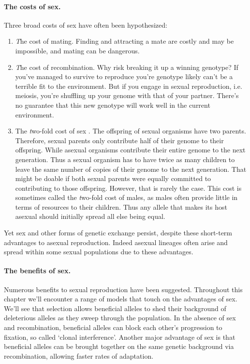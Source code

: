 \paragraph{The costs of sex.}
Three broad costs of sex have often been hypothesized:
\begin{enumerate}
\item  {\emph The cost of mating}. Finding and attracting a mate are costly and may be impossible, and mating can be dangerous.
\item  {\emph The cost of recombination.} Why risk breaking it up a winning genotype? If you've managed to survive to reproduce you're genotype likely can't be a terrible fit to the environment. But if you engage in sexual reproduction, i.e. meiosis, you're shuffling up your genome with that of your partner. There's no guarantee that this new genotype will work well in the current environment. 
\item The  {\emph two-fold cost of sex} \citep{smith1971origin}. The offspring of sexual organisms have two parents. Therefore, sexual parents only contribute half of their genome to their offspring. While asexual organisms contribute their entire genome to the next generation. Thus a sexual organism has to have twice as many children to leave the same number of copies of their genome to the next generation. That might be doable if both sexual parents were equally committed to contributing to those offspring. However, that is rarely the case. This cost is sometimes called the {\emph two-fold cost of males}, as males often provide little in terms of resources to their children. Thus any allele that makes its host asexual should initially spread all else being equal. 
\end{enumerate}
Yet sex and other forms of genetic exchange persist, despite these short-term advantages to asexual reproduction. Indeed asexual lineages often arise and spread within some sexual populations due to these advantages. 

\paragraph{The benefits of sex.}
Numerous benefits to sexual reproduction have been suggested. Throughout this chapter we'll encounter a range of models that touch on the advantages of sex. We'll see that selection allows beneficial alleles to shed their background of deleterious alleles as they sweep through the population. In the absence of sex and recombination, beneficial alleles can block each other's progression to fixation, so called `clonal interference'. Another major advantage of sex is that beneficial alleles can be brought together on the same genetic background via recombination, allowing faster rates of adaptation. 

